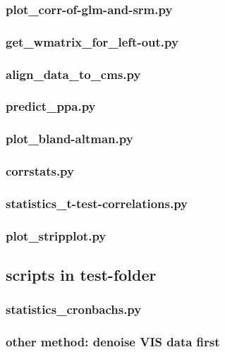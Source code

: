 \subsubsection{plot\_corr-of-glm-and-srm.py}


\subsubsection{get\_wmatrix\_for\_left-out.py}


\subsubsection{align\_data\_to\_cms.py}


\subsubsection{predict\_ppa.py}


\subsubsection{plot\_bland-altman.py}


\subsubsection{corrstats.py}


\subsubsection{statistics\_t-test-correlations.py}


\subsubsection{plot\_stripplot.py}



\subsection{scripts in test-folder}


\subsubsection{statistics\_cronbachs.py}


\subsubsection{other method: denoise VIS data first}

